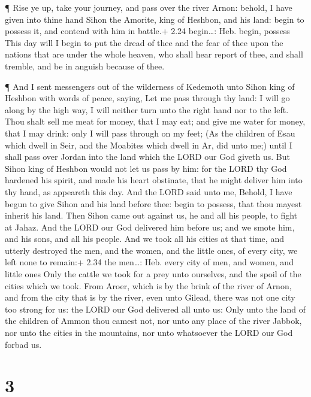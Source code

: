  ¶ Rise ye up, take your journey, and pass over the river
Arnon: behold, I have given into thine hand Sihon the Amorite, king of
Heshbon, and his land: begin to possess it, and contend with him in
battle.+ 2.24 begin\ldots: Heb. begin, possess  This day
will I begin to put the dread of thee and the fear of thee upon the
nations that are under the whole heaven, who shall hear report of thee,
and shall tremble, and be in anguish because of thee.

 ¶ And I sent messengers out of the wilderness of Kedemoth
unto Sihon king of Heshbon with words of peace, saying, 
Let me pass through thy land: I will go along by the high way, I will
neither turn unto the right hand nor to the left.  Thou
shalt sell me meat for money, that I may eat; and give me water for
money, that I may drink: only I will pass through on my feet;
 (As the children of Esau which dwell in Seir, and the
Moabites which dwell in Ar, did unto me;) until I shall pass over Jordan
into the land which the LORD our God giveth us.  But Sihon
king of Heshbon would not let us pass by him: for the LORD thy God
hardened his spirit, and made his heart obstinate, that he might deliver
him into thy hand, as appeareth this day.  And the LORD
said unto me, Behold, I have begun to give Sihon and his land before
thee: begin to possess, that thou mayest inherit his land. 
Then Sihon came out against us, he and all his people, to fight at
Jahaz.  And the LORD our God delivered him before us; and
we smote him, and his sons, and all his people.  And we
took all his cities at that time, and utterly destroyed the men, and the
women, and the little ones, of every city, we left none to remain:+ 2.34
the men\ldots: Heb. every city of men, and women, and little ones
 Only the cattle we took for a prey unto ourselves, and the
spoil of the cities which we took.  From Aroer, which is by
the brink of the river of Arnon, and from the city that is by the river,
even unto Gilead, there was not one city too strong for us: the LORD our
God delivered all unto us:  Only unto the land of the
children of Ammon thou camest not, nor unto any place of the river
Jabbok, nor unto the cities in the mountains, nor unto whatsoever the
LORD our God forbad us.

\hypertarget{section-2}{%
\section{3}\label{section-2}}

